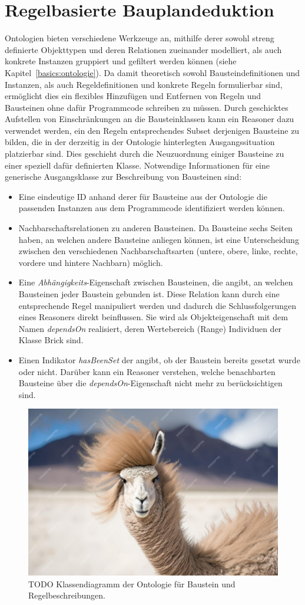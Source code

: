 \section{Regelbasierte Bauplandeduktion}\label{concept:regelbasierte_bauplandeduktion}
Ontologien bieten verschiedene Werkzeuge an, mithilfe derer sowohl streng definierte Objekttypen und deren Relationen zueinander modelliert, als auch konkrete Instanzen gruppiert und gefiltert werden können (siehe Kapitel~\ref{basics:ontologie}).
Da damit theoretisch sowohl Bausteindefinitionen und Instanzen, als auch Regeldefinitionen und konkrete Regeln formulierbar sind, ermöglicht dies ein flexibles Hinzufügen und Entfernen von Regeln und Bausteinen ohne dafür Programmcode schreiben zu müssen.
Durch geschicktes Aufstellen von Einschränkungen an die Bausteinklassen kann ein Reasoner dazu verwendet werden, ein den Regeln entsprechendes Subset derjenigen Bausteine zu bilden, die in der derzeitig in der Ontologie hinterlegten Ausgangssituation platzierbar sind.
Dies geschieht durch die Neuzuordnung einiger Bausteine zu einer speziell dafür definierten Klasse.
Notwendige Informationen für eine generische Ausgangsklasse zur Beschreibung von Bausteinen sind:
\begin{itemize}
  \item Eine eindeutige ID anhand derer für Bausteine aus der Ontologie die passenden Instanzen aus dem Programmcode identifiziert werden können.
  \item Nachbarschaftsrelationen zu anderen Bausteinen. 
  Da Bausteine sechs Seiten haben, an welchen andere Bausteine anliegen können, ist eine Unterscheidung zwischen den verschiedenen Nachbarschaftsarten (untere, obere, linke, rechte, vordere und hintere Nachbarn) möglich.
  \item Eine \textit{Abhängigkeits}-Eigenschaft zwischen Bausteinen, die angibt, an welchen Bausteinen jeder Baustein gebunden ist. 
  Diese Relation kann durch eine entsprechende Regel manipuliert werden und dadurch die Schlussfolgerungen eines Reasoners direkt beinflussen. 
  Sie wird als Objekteigenschaft mit dem Namen \textit{dependsOn} realisiert, deren Wertebereich (Range) Individuen der Klasse Brick sind.
  \item Einen Indikator \textit{hasBeenSet} der angibt, ob der Baustein bereits gesetzt wurde oder nicht. 
  Darüber kann ein Reasoner verstehen, welche benachbarten Bausteine über die \textit{dependsOn}-Eigenschaft nicht mehr zu berücksichtigen sind.
\end{itemize}
\begin{figure}[htb]
  \centering
  \includegraphics[width=0.4\columnwidth]{fig/TODO.jpg}
  \caption{TODO Klassendiagramm der Ontologie für Baustein und Regelbeschreibungen.}\label{fig:concept:ontologie_diagramm}
\end{figure}
